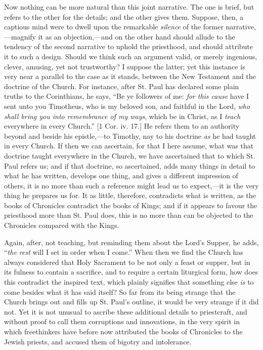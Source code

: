 Now nothing can be more natural than this joint narrative. The one
is brief, but refers to the other for the details; and the other gives
them. Suppose, then, a captious mind were to dwell upon the remarkable
\emph{silence} of the former narrative,—magnify it as an objection,—and
on the other hand should allude to the tendency of the second
narrative to uphold the priesthood, and should attribute it to such a
design. Should we think such an argument valid, or merely ingenious,
clever, amusing, yet not trustworthy? I suppose the latter; yet this
instance is very near a parallel to the case as it stands, between the
New Testament and the doctrine of the Church. For instance, after St.
Paul has declared some plain truths to the Corinthians, he says,
``Be ye followers of me: \emph{for this cause} have I sent unto
you Timotheus, who is my beloved son, and faithful in the Lord, \emph{who
shall bring you into remembrance of my ways}, which be in Christ,
as I \emph{teach} everywhere in every Church.'' [1 Cor. iv. 17.]
He refers them to an authority beyond and beside his epistle,—to
Timothy, nay to his doctrine \emph{as} he had taught in every Church.
If then we can ascertain, for that I here assume, what was that
doctrine taught everywhere in the Church, we have ascertained that to
which St. Paul refers us; and if that doctrine, so ascertained, adds
many things in detail to what he has written, develops one thing, and
gives a different impression of others, it is no more than such a
reference might lead us to expect,—it is the very thing he prepares
us for. It as little, therefore, contradicts what is written, as the
books of Chronicles contradict the books of Kings; and if it appears
to favour the priesthood more than St. Paul does, this is no more than
can be objected to the Chronicles compared with the Kings.

Again, after, not teaching, but reminding them about the Lord's
Supper, he adds, ``\emph{the rest} will I set in order when I
come.'' When then we find the Church has always considered that
Holy Sacrament to be not only a feast or supper, but in its fulness to
contain a sacrifice, and to require a certain liturgical form, how
does this contradict the inspired text, which plainly signifies that
something else \emph{is} to come besides what it has said itself? So
far from its being strange that the Church brings out and fills up St.
Paul's outline, it would be very strange if it did not. Yet it is not
unusual to ascribe these additional details to priestcraft, and
without proof to call them corruptions and innovations, in the very
spirit in which freethinkers have before now attributed the
books of Chronicles to the Jewish priests, and accused them of bigotry
and intolerance.

